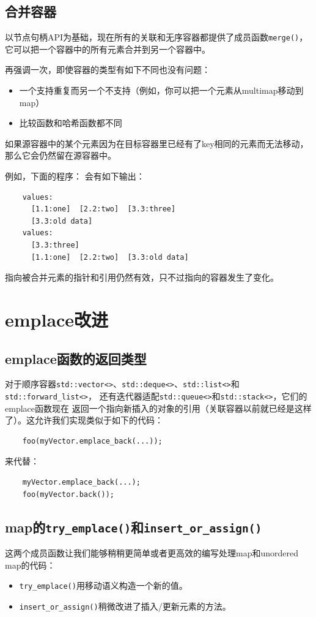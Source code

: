 \subsection{合并容器}
以节点句柄API为基础，现在所有的关联和无序容器都提供了成员函数\texttt{merge()}，
它可以把一个容器中的所有元素合并到另一个容器中。

再强调一次，即使容器的类型有如下不同也没有问题：
\begin{itemize}
    \item 一个支持重复而另一个不支持（例如，你可以把一个元素从multimap移动到map）
    \item 比较函数和哈希函数都不同
\end{itemize}
如果源容器中的某个元素因为在目标容器里已经有了key相同的元素而无法移动，
那么它会仍然留在源容器中。

例如，下面的程序：
会有如下输出：
\begin{lstlisting}
    values:
      [1.1:one]  [2.2:two]  [3.3:three]
      [3.3:old data]
    values:
      [3.3:three]
      [1.1:one]  [2.2:two]  [3.3:old data]
\end{lstlisting}
指向被合并元素的指针和引用仍然有效，只不过指向的容器发生了变化。


\section{emplace改进}

\subsection{emplace函数的返回类型}
对于顺序容器\texttt{std::vector<>}、\texttt{std::deque<>}、\texttt{std::list<>}和\texttt{std::forward\_list<>}，
还有迭代器适配\texttt{std::queue<>}和\texttt{std::stack<>}，它们的emplace函数现在
返回一个指向新插入的对象的引用（关联容器以前就已经是这样了）。这允许我们实现类似于如下的代码：
\begin{lstlisting}
    foo(myVector.emplace_back(...));
\end{lstlisting}
来代替：
\begin{lstlisting}
    myVector.emplace_back(...);
    foo(myVector.back());
\end{lstlisting}

\subsection{map的\texttt{try\_emplace()}和\texttt{insert\_or\_assign()}}
这两个成员函数让我们能够稍稍更简单或者更高效的编写处理map和unordered map的代码：
\begin{itemize}
    \item \texttt{try\_emplace()}用移动语义构造一个新的值。
    \item \texttt{insert\_or\_assign()}稍微改进了插入/更新元素的方法。
\end{itemize}

